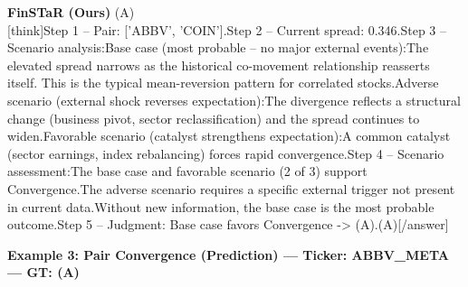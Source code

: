 \begin{minipage}[t]{0.41\textwidth}
\colorbox{green!10}{\parbox{\dimexpr\textwidth-2\fboxsep}{
\textbf{FinSTaR (Ours)} \textcolor{green!50!black}{(A)} \\[2pt]
\tiny
[think]\newline Step 1 -- Pair: ['ABBV', 'COIN'].\newline Step 2 -- Current spread: 0.346.\newline Step 3 -- Scenario analysis:\newline   Base case (most probable -- no major external events):\newline     The elevated spread narrows as the historical co-movement relationship reasserts itself. This is the typical mean-reversion pattern for correlated stocks.\newline   Adverse scenario (external shock reverses expectation):\newline     The divergence reflects a structural change (business pivot, sector reclassification) and the spread continues to widen.\newline   Favorable scenario (catalyst strengthens expectation):\newline     A common catalyst (sector earnings, index rebalancing) forces rapid convergence.\newline Step 4 -- Scenario assessment:\newline   The base case and favorable scenario (2 of 3) support Convergence.\newline   The adverse scenario requires a specific external trigger not present in current data.\newline   Without new information, the base case is the most probable outcome.\newline Step 5 -- Judgment: Base case favors Convergence -> (A).\newline [/think]\newline [answer](A)[/answer]
}}
\end{minipage}
\vspace{8pt}


\noindent
\textbf{Example 3: Pair Convergence (Prediction) --- Ticker: ABBV\_META --- GT: (A)}
\vspace{2pt}

